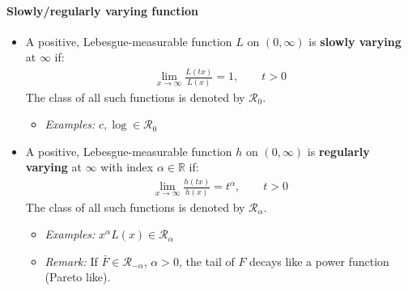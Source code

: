 \documentclass[a4paper,landscape,8pt,fleqn]{scrartcl}
\renewcommand{\emph}[1]{\textbf{#1}}
\begin{document}
\begin{multicols*}{3}
\paragraph{Slowly/regularly varying function}
\begin{itemize}
\item A positive, Lebesgue-measurable function $L$ on $(0,\infty)$ is \emph{slowly varying} at $\infty$ if:
\begin{align*}
\lim_{x \to \infty} \frac{L(tx)}{L(x)} = 1, \qquad t > 0
\end{align*}
The class of all such functions is denoted by $\mathcal{R}_0$.
\begin{itemize}
\item \textit{Examples:} $c, \log \in \mathcal{R}_0$
\end{itemize}
\item A positive, Lebesgue-measurable function $h$ on $(0,\infty)$ is \emph{regularly varying} at $\infty$ with index $\alpha \in \mathbb{R}$ if:
\begin{align*}
\lim_{x \to \infty} \frac{h(tx)}{h(x)} = t^\alpha, \qquad t > 0
\end{align*}
The class of all such functions is denoted by $\mathcal{R}_\alpha$.
\begin{itemize}
\item \textit{Examples:} $x^\alpha L(x) \in \mathcal{R}_\alpha$
\item \textit{Remark:} If $\bar F \in \mathcal{R}_{-\alpha}$, $\alpha > 0$, the tail of $F$ decays like a power function (Pareto like).
\end{itemize}
\end{itemize}


\end{multicols*}
\end{document}

